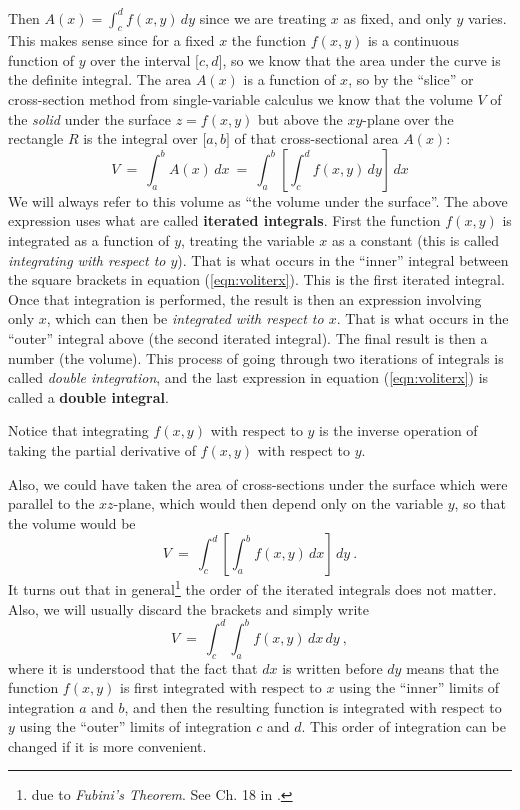 Then $A(x) = \int_c^d f(x,y)\,dy$ since we are treating $x$ as fixed, and only $y$ varies. This makes sense since
for a fixed $x$ the function $f(x,y)$ is a continuous function of $y$ over the interval $\lbrack c,d \rbrack$, so
we know that the area under the curve is the definite integral. The area $A(x)$ is a function of $x$, so by the
``slice'' or cross-section method from single-variable calculus we know that the volume $V$ of the \emph{solid} under
the surface $z=f(x,y)$ but above the $xy$-plane over the rectangle $R$ is the integral over $\lbrack a,b \rbrack$ of
that cross-sectional area $A(x)$:
\begin{equation}\label{eqn:voliterx}
 V ~=~ \int_a^b A(x)\,dx ~=~ \int_a^b \left[ \int_c^d f(x,y)\,dy \right] \,dx
\end{equation}
We will always refer to this volume as ``the volume under the surface''.
The above expression uses what are called \textbf{iterated integrals}. First the function $f(x,y)$ is integrated as a
function of $y$, treating the variable $x$ as a constant (this is called \emph{integrating with respect to $y$}). That
is what occurs in the ``inner'' integral between the square brackets in equation (\ref{eqn:voliterx}). This is the
first iterated integral.
Once that integration is performed, the result is then an expression involving only $x$, which can then be
\emph{integrated with respect to $x$}. That is what occurs in the ``outer'' integral above (the second iterated
integral). The final result is
then a number (the volume). This process of going through two iterations of integrals is called \emph{double
integration}, and the last expression in equation (\ref{eqn:voliterx}) is called a \textbf{double integral}.

Notice that integrating $f(x,y)$ with respect to $y$ is the inverse operation of taking the partial
derivative of $f(x,y)$ with respect to $y$. 

Also, we could have taken the area of cross-sections under
the surface which were parallel to the $xz$-plane, which would then depend only on the variable $y$, so that the volume would be
\begin{equation}\label{eqn:volitery}
 V ~=~ \int_c^d \left[ \int_a^b f(x,y)\,dx \right] \,dy ~.
\end{equation}
It turns out that in general\footnote{due to \emph{Fubini's Theorem}. See Ch. 18 in \cite{tm}.} the order of the
iterated integrals does not matter. Also, we will usually discard the brackets and simply write
\begin{equation}\label{eqn:volint}
 V ~=~ \int_c^d \int_a^b f(x,y)\,dx \,dy ~,
\end{equation}
where it is understood that the fact that $dx$ is written before $dy$ means that the function $f(x,y)$ is first
integrated with respect to $x$ using the ``inner'' limits of integration $a$ and $b$, and then the resulting function
is integrated with respect to $y$ using the ``outer'' limits of integration $c$ and $d$. This order of integration can
be changed if it is more convenient.\index{$\iint$}

